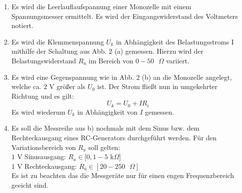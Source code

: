 \begin{enumerate}
    \item Es wird die Leerlauflaufspannung einer Monozelle mit einem Spannungsmesser ermittelt.
    Es wird der Eingangswiderstand des Voltmeters notiert.

    \item Es wird die Klemmenspannung $U_k$ in Abhängigkeit des Belastungsstroms I mithilfe
    der Schaltung aus Abb. 2 (a) gemessen.
    Hierzu wird der Belastungswiderstand $R_a$ im Bereich von $ 0-50\text{ }\Omega$ variiert.

    \item Es wird eine Gegenspannung wie in Abb. 2 (b) an die Monozelle angelegt, welche ca. $2$ V
    größer als $U_0$ ist. Der Strom fließt nun in umgekehrter Richtung und es gilt:
    \begin{equation}
	    U_k = U_0 + IR_i
    \end{equation}
    Es wird wiederum $U_k$ in Abhängigkeit von $I$ gemessen.

    \item Es soll die Messreihe aus b) nochmals mit dem Sinus bzw. dem
    Rechteckausgang eines RC-Generators durchgeführt werden. Für den Variationsbereich
    von $R_a$ soll gelten:\\
    $1$ V Sinusausgang: $R_a \in [0,1 - 5 $ k$\Omega]$\\
    $1$ V Rechteckausgang: $R_a \in [20 -250\text{ }\Omega]$\\
    Es ist zu beachten das die Messgeräte nur für einen engen Frequenzbereich geeicht sind.
\end{enumerate}
